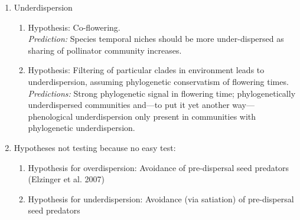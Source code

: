 \documentclass[11pt,a4paper]{article}
\begin{document}
\begin{enumerate}
\begin{enumerate}
\begin{enumerate}
\end{enumerate}
\item Underdispersion
\begin{enumerate}
\item Hypothesis: Co-flowering. \\ \emph{Prediction:} Species temporal niches should be more under-dispersed as sharing of pollinator community increases.
\item Hypothesis: Filtering of particular clades in environment leads to underdispersion, assuming phylogenetic conservatism of flowering times. \\ \emph{Predictions:}  Strong phylogenetic signal in flowering time; phylogenetically underdispersed communities and---to put it yet another way---phenological underdispersion only present in communities with phylogenetic underdispersion.
\end{enumerate}
\item Hypotheses not testing because no easy test:
\begin{enumerate}
\item Hypothesis for overdispersion: Avoidance of pre-dispersal seed predators (Elzinger et al. 2007)
\item Hypothesis for underdispersion: Avoidance (via satiation) of pre-dispersal seed predators
\end{enumerate}
\end{enumerate}
\end{enumerate}
\end{document}
